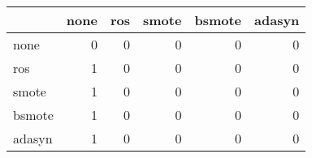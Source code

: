 \begin{tabular}{lrrrrr}
\hline
        &   none &   ros &   smote &   bsmote &   adasyn \\
\hline
 none   &      0 &     0 &       0 &        0 &        0 \\
 ros    &      1 &     0 &       0 &        0 &        0 \\
 smote  &      1 &     0 &       0 &        0 &        0 \\
 bsmote &      1 &     0 &       0 &        0 &        0 \\
 adasyn &      1 &     0 &       0 &        0 &        0 \\
\hline
\end{tabular}